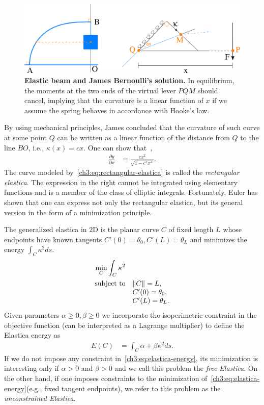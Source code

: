 \begin{figure}
\center
\includegraphics[scale=0.36]{figures/chapter3/elastica/james-scheme.png}
\caption{\textbf{Elastic beam and James Bernoulli's solution.} In equilibrium, the moments at the two ends of the virtual lever $PQM$ should cancel, implying that the curvature is a linear function of $x$ if we assume the spring behaves in accordance with Hooke's law.}
\label{ch3:fig:james-scheme-elastica}
\end{figure}

By using mechanical principles, James concluded that the curvature of such curve at some point $Q$ can be written as a linear function of the distance from $Q$ to the line $BO$, i.e., $\kappa(x) = cx$. One can show that~\cite{levien08elastica,truesdell60rational},
\begin{align}
	\frac{\partial y}{\partial x} &= \frac{cx^2}{ \sqrt{1-c^2x^4} }.
	\label{ch3:eq:rectangular-elastica}
\end{align}
%
The curve modeled by~\cref{ch3:eq:rectangular-elastica} is called the \emph{rectangular elastica}. The expression in the right cannot be integrated using elementary functions and is a member of the class of elliptic integrals. Fortunately, Euler has shown that one can express not only the rectangular elastica, but its general version in the form of a minimization principle. 

The generalized elastica in $2$D is the planar curve $C$ of fixed length $L$ whose endpoints have known tangents $C'(0)=\theta_0,C'(L)=\theta_L$ and minimizes the energy $\int_{C} \kappa^2 ds$.
\begin{align*}
	\begin{array}{rl}
		\displaystyle \min_{C} \int_{C}{\kappa ^2} \\[1em]
		\text{subject to}& \lVert C\rVert = L,\\
		& C'(0) = \theta_0, \\
		& C'(L) = \theta_L.
	\end{array}	
\end{align*}
%
Given parameters $\alpha \geq 0, \beta \geq 0$ we incorporate the isoperimetric constraint in the objective function (can be interpreted as a Lagrange multiplier) to define the Elastica energy as
\begin{align}
	E(C) &= \int_{C}{\alpha + \beta \kappa^2 ds}.
	\label{ch3:eq:elastica-energy}
\end{align}
%
If we do not impose any constraint in~\cref{ch3:eq:elastica-energy}, its minimization is interesting only if $\alpha >0$ and $\beta >0$ and we call this problem the \emph{free Elastica}. On the other hand, if one imposes constraints to the minimization of~\cref{ch3:eq:elastica-energy}(e.g., fixed tangent endpoints), we refer to this problem as the \emph{unconstrained Elastica}.

